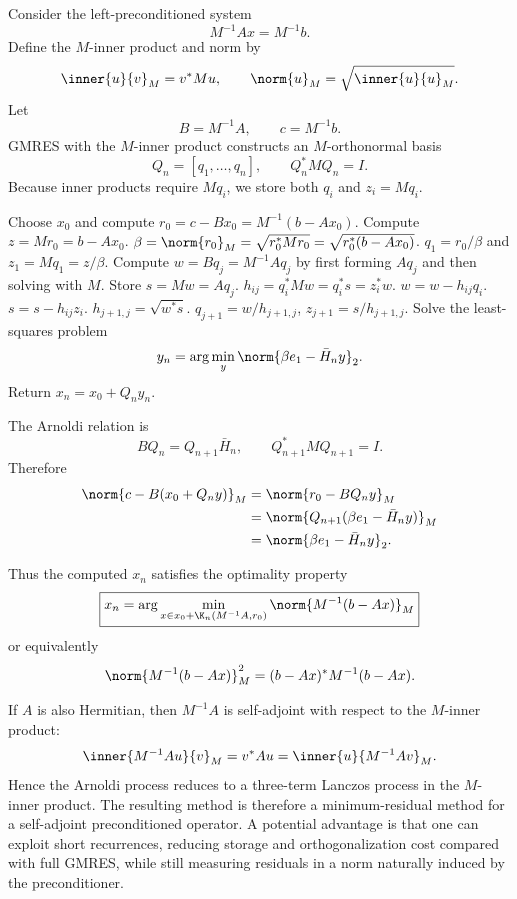 \documentclass{ctexart}
\begin{document}
\begin{solution}
  Consider the left-preconditioned system
  \[
    M^{-1}Ax=M^{-1}b.
  \]
  Define the $M$-inner product and norm by
  \[
    \inner{u}{v}_M=v^*Mu,
    \qquad
    \norm{u}_M=\sqrt{\inner{u}{u}_M}.
  \]
  Let
  \[
    B=M^{-1}A,
    \qquad
    c=M^{-1}b.
  \]
  GMRES with the $M$-inner product constructs an $M$-orthonormal basis
  \[
    Q_n=[q_1,\ldots,q_n],
    \qquad
    Q_n^*MQ_n=I.
  \]
  Because inner products require $Mq_i$, we store both $q_i$ and $z_i=Mq_i$.

  \begin{algorithm}[H]
    \caption{Left-preconditioned GMRES with $M$-inner product}
    \begin{algorithmic}[1]
      \State Choose $x_0$ and compute $r_0=c-Bx_0=M^{-1}(b-Ax_0)$.
      \State Compute $z=M r_0=b-Ax_0$.
      \State $\beta=\norm{r_0}_M=\sqrt{r_0^*Mr_0}=\sqrt{r_0^*(b-Ax_0)}$.
      \State $q_1=r_0/\beta$ and $z_1=Mq_1=z/\beta$.
      \State Compute $w=Bq_j=M^{-1}Aq_j$ by first forming $Aq_j$ and then solving with $M$.
      \State Store $s=Mw=Aq_j$.
       
      \State $h_{ij}=q_i^*Mw=q_i^*s=z_i^*w$.
      \State $w=w-h_{ij}q_i$.
      \State $s=s-h_{ij}z_i$. 
      \EndFor
      \State $h_{j+1,j}=\sqrt{w^*s}$.
      \State $q_{j+1}=w/h_{j+1,j}$, \quad $z_{j+1}=s/h_{j+1,j}$.
      \EndFor
      \State Solve the least-squares problem
      \[
        y_n=\arg\min_y\norm{\beta e_1-\bar H_ny}_2.
      \]
      \State Return $x_n=x_0+Q_ny_n$.
    \end{algorithmic}
  \end{algorithm}

  The Arnoldi relation is
  \[
    BQ_n=Q_{n+1}\bar H_n,
    \qquad
    Q_{n+1}^*MQ_{n+1}=I.
  \]
  Therefore
  \begin{equation}
    \begin{aligned}
      \norm{c-B(x_0+Q_ny)}_M
      &=\norm{r_0-BQ_ny}_M\\
      &=\norm{Q_{n+1}(\beta e_1-\bar H_ny)}_M\\
      &=\norm{\beta e_1-\bar H_ny}_2.
    \end{aligned}
  \end{equation}

  Thus the computed $x_n$ satisfies the optimality property
  \[
    \boxed{
      x_n=\arg\min_{x\in x_0+\K_n(M^{-1}A,r_0)}
      \norm{M^{-1}(b-Ax)}_M
    }
  \]
  or equivalently
  \[
    \norm{M^{-1}(b-Ax)}_M^2
    =(b-Ax)^*M^{-1}(b-Ax).
  \]

  If $A$ is also Hermitian, then $M^{-1}A$ is self-adjoint with respect to the $M$-inner product:
  \[
    \inner{M^{-1}Au}{v}_M
    =v^*A u
    =\inner{u}{M^{-1}Av}_M.
  \]
  Hence the Arnoldi process reduces to a three-term Lanczos process in the $M$-inner product.  The resulting method is therefore a minimum-residual method for a self-adjoint preconditioned operator.  A potential advantage is that one can exploit short recurrences, reducing storage and orthogonalization cost compared with full GMRES, while still measuring residuals in a norm naturally induced by the preconditioner.
\end{solution}
\end{document}
